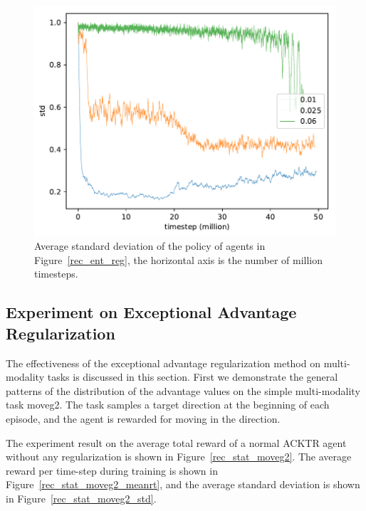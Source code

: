 \begin{figure}[!htbp]
	\includegraphics[width=\textwidth]{images/rec_180609_std_ent_reg.pdf}
	\centering
	\caption{Average standard deviation of the policy of agents in Figure~\ref{rec_ent_reg}, the horizontal axis is the number of million timesteps.}\label{rec_std_ent_reg}
\end{figure}

\subsection{Experiment on Exceptional Advantage Regularization}\label{sec_exp_adv_reg}
The effectiveness of the exceptional advantage regularization method on multi-modality tasks is discussed in this section.
First we demonstrate the general patterns of the distribution of the advantage values on the simple multi-modality task moveg2. The task samples a target direction at the beginning of each episode, and the agent is rewarded for moving in the direction.

The experiment result on the average total reward of a normal ACKTR agent without any regularization is shown in Figure~\ref{rec_stat_moveg2}. The average reward per time-step during training is shown in Figure~\ref{rec_stat_moveg2_meanrt}, and the average standard deviation is shown in Figure~\ref{rec_stat_moveg2_std}.


